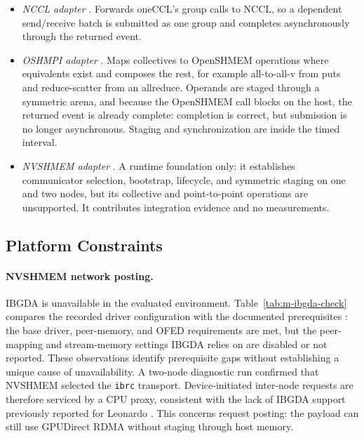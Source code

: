 \begin{itemize}
    \item \emph{NCCL adapter} \cite{merenda_oneccl_nccl_groups_2026}. Forwards oneCCL's group calls to NCCL, so a dependent send/receive batch is submitted as one group and completes asynchronously through the returned event.
    \item \emph{OSHMPI adapter} \cite{merenda_oneccl_oshmpi_2026}. Maps collectives to OpenSHMEM operations where equivalents exist and composes the rest, for example all-to-all-v from puts and reduce-scatter from an allreduce. Operands are staged through a symmetric arena, and because the OpenSHMEM call blocks on the host, the returned event is already complete: completion is correct, but submission is no longer asynchronous. Staging and synchronization are inside the timed interval.
    \item \emph{NVSHMEM adapter} \cite{merenda_oneccl_nvshmem_2026}. A runtime foundation only: it establishes communicator selection, bootstrap, lifecycle, and symmetric staging on one and two nodes, but its collective and point-to-point operations are unsupported. It contributes integration evidence and no measurements.
\end{itemize}

\subsection{Platform Constraints}\label{sec:ibgda-check}

\paragraph{NVSHMEM network posting.} IBGDA is unavailable in the evaluated environment. Table~\ref{tab:m-ibgda-check} compares the recorded driver configuration with the documented prerequisites \cite{nvidia_nvshmem_install_2026}: the base driver, peer-memory, and OFED requirements are met, but the peer-mapping and stream-memory settings IBGDA relies on are disabled or not reported. These observations identify prerequisite gaps without establishing a unique cause of unavailability. A two-node diagnostic run confirmed that NVSHMEM selected the \texttt{ibrc} transport. Device-initiated inter-node requests are therefore serviced by a CPU proxy, consistent with the lack of IBGDA support previously reported for Leonardo \cite{trotter_cpu-_2025}. This concerns request posting: the payload can still use GPUDirect RDMA without staging through host memory.

